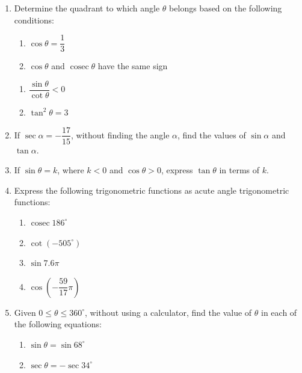 \documentclass{report}
\begin{document}
\begin{enumerate}
    \item Determine the quadrant to which angle $\theta$ belongs based on the following conditions:
    \begin{multicols}{2}
        \begin{enumerate}[label=(\alph*)]
            \item \vspace*{-2.4em}$\cos \theta = \dfrac{1}{3}$
            \item $\cos \theta$ and $\operatorname{cosec} \theta$ have the same sign
            \end{enumerate}  
    \end{multicols}
    \begin{multicols}{2}
        \begin{enumerate}[label=(\alph*),start=3]
            \item $\dfrac{\sin \theta}{\cot \theta} < 0$
            \item \vspace*{-0.3em}$\tan^2 \theta = 3$
        \end{enumerate}
    \end{multicols}

    \item If $\sec \alpha = -\dfrac{17}{15}$, without finding the angle $\alpha$, find the values of $\sin \alpha$ and $\tan \alpha$.

    \item If $\sin \theta = k$, where $k < 0$ and $\cos \theta > 0$, express $\tan \theta$ in terms of $k$.
    
    \item Express the following trigonometric functions as acute angle trigonometric functions:
    \begin{multicols}{4}
        \begin{enumerate}[label=(\alph*)]
            \item $\operatorname{cosec} 186^\circ$
            \item $\cot \left(-505^\circ\right)$
            \item $\sin 7.6 \pi$
            \item $\cos \left(-\dfrac{59}{17} \pi\right)$
            \end{enumerate}
    \end{multicols}

    \item Given $0 \leq \theta \leq 360^\circ$, without using a calculator, find the value of $\theta$ in each of the following equations:
    \begin{multicols}{2}
        \begin{enumerate}[label=(\alph*)]
            \item $\sin \theta = \sin 68^\circ$
            \item $\sec \theta = -\sec 34^\circ$
            \end{enumerate}
    \end{multicols}
\end{enumerate}
\end{document}
